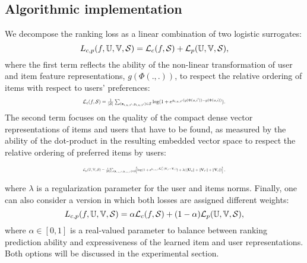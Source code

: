 \documentclass[10pt,journal,compsoc]{IEEEtran}
\newcommand{\vecU}{\mathbf{U}}
\newcommand{\vecI}{\mathbf{V}}
\newcommand{\Loss}{\mathcal{L}}
\newcommand{\Trn}{\mathcal{S}}
\newcommand{\bfZ}{\mathbf{z}}
\begin{document}
\begin{sloppypar}
\subsection{Algorithmic implementation}

We decompose the ranking loss as a linear combination of two logistic surrogates:
   \begin{equation}
   \label{eq:rankingLoss}
   \mathnormal
   \Loss_{c,p}(f,\mathbb{U},\mathbb{V},\Trn)=\Loss_c(f,\Trn)+\Loss_p(\mathbb{U},\mathbb{V},\Trn),
    \end{equation}
   where the first term reflects the ability of the non-linear transformation of user and item feature representations, $g(\Phi(.,.))$, to respect the relative ordering of items with respect to users' preferences:
     \begin{equation}
     \resizebox{0.5\textwidth}{!}{$
    \label{eq:ranking_loss}
    \Loss_c(f,\Trn)=\frac{1}{|\Trn|}\sum_{(\bfZ_{i,u,i'},y_{i,u,i'})\in \Trn} \log(1+e^{y_{i,u,i'}(g(\Phi(u,i'))-g(\Phi(u,i))}).
    $}
    \end{equation}
    The second term focuses on the quality of the compact dense vector representations of items and users that have to be found, as measured by the ability of the dot-product in the resulting embedded vector space to respect the relative ordering of preferred items by users:

    \begin{equation}
    \resizebox{0.5\textwidth}{!}{$
    \label{eq:embedding_loss}
    \Loss_p(\mathbb{U},\mathbb{V},\Trn)=\frac{1}{|\Trn|}\!\!\sum_{(\bfZ_{i,u,i'},y_{i,u,i'})\in\Trn}\!\!\left[\log(1+e^{y_{i,u,i'}\vecU_u^\top(\vecI_{i'}-\vecI_{i})})+\lambda(\|\vecU_u\|+\|\vecI_{i'}\|+\|\vecI_{i}\|)\right],
    $}
    \end{equation}

    where $\lambda$ is a regularization parameter for the user and items norms.
Finally, one can also consider a version in which both losses are assigned different weights:
    \begin{equation}\label{eq:rankingLoss_alpha}
   \mathnormal
   \Loss_{c,p}(f,\mathbb{U},\mathbb{V},\Trn)=\alpha\Loss_c(f,\Trn)+(1-\alpha)\Loss_p(\mathbb{U},\mathbb{V},\Trn),
   \end{equation}
where $\alpha\in [0,1]$ is a real-valued parameter to balance between ranking prediction ability and expressiveness of the learned item and user representations. Both options will be discussed in the experimental section.


\end{sloppypar}
\end{document}
